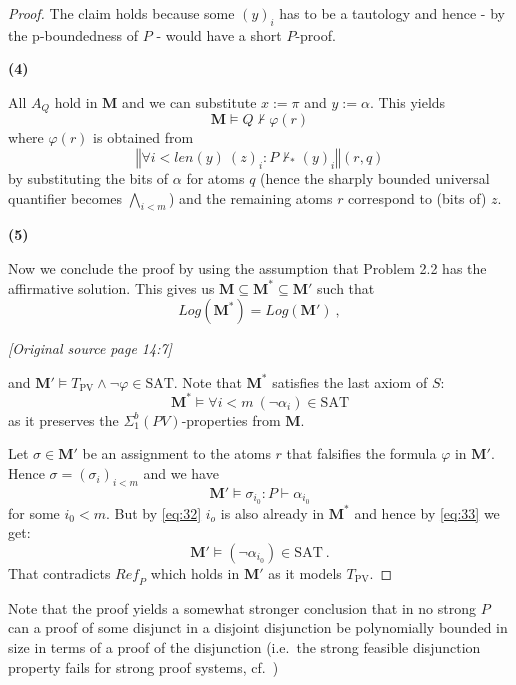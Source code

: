 \documentclass[11pt]{article}
\newcommand{\TPV}{T_{\mathrm{PV}}}
\newcommand{\PV}{\mathit{PV}}
\newcommand{\SAT}{\mathrm{SAT}}
\newcommand{\Log}{\mathit{Log}}
\newcommand{\len}{\mathit{len}}
\newcommand{\srcRef}{\mathit{Ref}}
\newcommand{\tr}[1]{\left\Vert #1\right\Vert}
\newcommand{\sourcepage}[1]{\par\Needspace{5\baselineskip}\bigskip\noindent\textit{[Original source page 14:#1]}\par\medskip}
\begin{document}
\begin{proof}
The claim holds because some $(y)_i$ has to be a tautology and hence - by the p-boundedness of $P$ - would have a short $P$-proof.

\noindent\textbf{(4)}

All $A_Q$ hold in $\mathbf{M}$ and we can substitute $x:=\pi$ and $y:=\alpha$. This yields
\[
\mathbf{M}\models Q\not\vdash\varphi(r)
\]
where $\varphi(r)$ is obtained from
\[
\tr{\forall i<\len(y)\ (z)_i:P\not\vdash_*(y)_i}(r,q)
\]
by substituting the bits of $\alpha$ for atoms $q$ (hence the sharply bounded universal quantifier becomes $\bigwedge_{i<m}$) and the remaining atoms $r$ correspond to (bits of) $z$.

\noindent\textbf{(5)}

Now we conclude the proof by using the assumption that Problem 2.2 has the affirmative solution. This gives us $\mathbf{M}\subseteq \mathbf{M}^*\subseteq \mathbf{M}'$ such that
\begin{equation}
\Log(\mathbf{M}^*)=\Log(\mathbf{M}')\ ,
\tag{3.2}\label{eq:32}
\end{equation}

\sourcepage{7}
and $\mathbf{M}'\models\TPV\wedge\neg\varphi\in\SAT$. Note that $\mathbf{M}^*$ satisfies the last axiom of $S$:
\begin{equation}
\mathbf{M}^*\models\forall i<m\ (\neg\alpha_i)\in\SAT
\tag{3.3}\label{eq:33}
\end{equation}
as it preserves the $\Sigma^b_1(\PV)$-properties from $\mathbf{M}$.

Let $\sigma\in \mathbf{M}'$ be an assignment to the atoms $r$ that falsifies the formula $\varphi$ in $\mathbf{M}'$. Hence $\sigma=(\sigma_i)_{i<m}$ and we have
\[
\mathbf{M}'\models\sigma_{i_0}:P\vdash\alpha_{i_0}
\]
for some $i_0<m$. But by \eqref{eq:32} $i_o$ is also already in $\mathbf{M}^*$ and hence by \eqref{eq:33} we get:
\[
\mathbf{M}'\models(\neg\alpha_{i_0})\in\SAT\ .
\]
That contradicts $\srcRef_P$ which holds in $\mathbf{M}'$ as it models $\TPV$.
\end{proof}
Note that the proof yields a somewhat stronger conclusion that in no strong $P$ can a proof of some disjunct in a disjoint disjunction be polynomially bounded in size in terms of a proof of the disjunction (i.e.\ the strong feasible disjunction property fails for strong proof systems, cf.\ \cite{Kra25})
\end{document}
